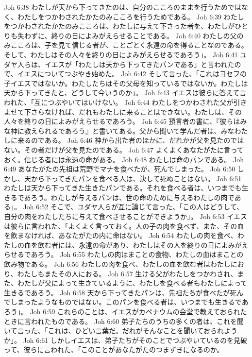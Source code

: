 Joh 6:38  わたしが天から下ってきたのは、自分のこころのままを行うためではなく、わたしをつかわされたかたのみこころを行うためである。
Joh 6:39  わたしをつかわされたかたのみこころは、わたしに与えて下さった者を、わたしがひとりも失わずに、終りの日によみがえらせることである。
Joh 6:40  わたしの父のみこころは、子を見て信じる者が、ことごとく永遠の命を得ることなのである。そして、わたしはその人々を終りの日によみがえらせるであろう」。
Joh 6:41  ユダヤ人らは、イエスが「わたしは天から下ってきたパンである」と言われたので、イエスについてつぶやき始めた。
Joh 6:42  そして言った、「これはヨセフの子イエスではないか。わたしたちはその父母を知っているではないか。わたしは天から下ってきたと、どうして今いうのか」。
Joh 6:43  イエスは彼らに答えて言われた、「互につぶやいてはいけない。
Joh 6:44  わたしをつかわされた父が引きよせて下さらなければ、だれもわたしに来ることはできない。わたしは、その人々を終りの日によみがえらせるであろう。
Joh 6:45  預言者の書に、『彼らはみな神に教えられるであろう』と書いてある。父から聞いて学んだ者は、みなわたしに来るのである。
Joh 6:46  神から出た者のほかに、だれかが父を見たのではない。その者だけが父を見たのである。
Joh 6:47  よくよくあなたがたに言っておく。信じる者には永遠の命がある。
Joh 6:48  わたしは命のパンである。
Joh 6:49  あなたがたの先祖は荒野でマナを食べたが、死んでしまった。
Joh 6:50  しかし、天から下ってきたパンを食べる人は、決して死ぬことはない。
Joh 6:51  わたしは天から下ってきた生きたパンである。それを食べる者は、いつまでも生きるであろう。わたしが与えるパンは、世の命のために与えるわたしの肉である」。
Joh 6:52  そこで、ユダヤ人らが互に論じて言った、「この人はどうして、自分の肉をわたしたちに与えて食べさせることができようか」。
Joh 6:53  イエスは彼らに言われた、「よくよく言っておく。人の子の肉を食べず、また、その血を飲まなければ、あなたがたの内に命はない。
Joh 6:54  わたしの肉を食べ、わたしの血を飲む者には、永遠の命があり、わたしはその人を終りの日によみがえらせるであろう。
Joh 6:55  わたしの肉はまことの食物、わたしの血はまことの飲み物である。
Joh 6:56  わたしの肉を食べ、わたしの血を飲む者はわたしにおり、わたしもまたその人におる。
Joh 6:57  生ける父がわたしをつかわされ、また、わたしが父によって生きているように、わたしを食べる者もわたしによって生きるであろう。
Joh 6:58  天から下ってきたパンは、先祖たちが食べたが死んでしまったようなものではない。このパンを食べる者は、いつまでも生きるであろう」。
Joh 6:59  これらのことは、イエスがカペナウムの会堂で教えておられたときに言われたものである。
Joh 6:60  弟子たちのうちの多くの者は、これを聞いて言った、「これは、ひどい言葉だ。だれがそんなことを聞いておられようか」。
Joh 6:61  しかしイエスは、弟子たちがそのことでつぶやいているのを見破って、彼らに言われた、「このことがあなたがたのつまずきになるのか。
